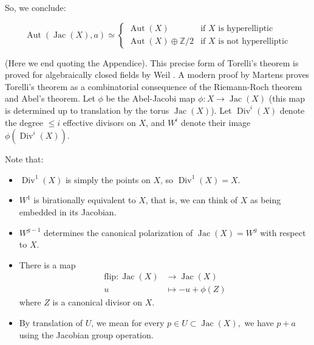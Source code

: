 \documentclass[12pt,reqno]{amsart}
\DeclareMathOperator{\Aut}{Aut}
\DeclareMathOperator{\Jac}{Jac}
\DeclareMathOperator{\Div}{Div}
\newcommand{\Z}{\mathbb{Z}}
\theoremstyle{definition}
\theoremstyle{remark}
\newtheorem*{remark}{Remark}
\newcommand{\ti}{\todo[inline]}
\begin{document}
So, we conclude: 

$$\Aut(\Jac(X), a) \simeq \begin{cases} \Aut(X) & \text{if } X \text{ is hyperelliptic} \\
\Aut(X) \oplus \Z/2 &  \text{if } X \text{ is not hyperelliptic}
\end{cases} $$



(Here we end quoting the Appendice). This precise form of Torelli's theorem is proved for algebraically closed fields by Weil \cite{oe}. A modern proof by Martens \cite{finn} proves Torelli's theorem as a combinatorial consequence of the Riemann-Roch theorem and Abel's theorem. Let $\phi$ be the Abel-Jacobi map $\phi: X \to \Jac(X)$ (this map is determined up to translation by the torus $\Jac(X)$). Let $\Div^i(X)$ denote the degree $\leq i$ effective divisors on $X$, and $W^i$ denote their image $\phi(\Div^i(X))$. 



Note that: 

\begin{itemize} 
\item $\Div^1(X)$ is simply the points on $X$, so  $\Div^1(X) = X$.

\item $W^1$ is birationally equivalent to $X$, that is, we can think of $X$ as being embedded in its Jacobian. 

\item  $W^{g-1}$ determines the canonical polarization of $\Jac(X) = W^g$ with respect to $X$.  

\item There is a map \begin{align*}
\text{flip}: \Jac(X) &\to \Jac(X)\\
u &\mapsto -u + \phi(Z)
\end{align*}
where $Z$ is a canonical divisor on $X$.
\item By translation of $U$, we mean for every $p \in U \subset \Jac(X),$ we have $p+a$ using the Jacobian group operation.
\end{itemize} 
\end{document}

